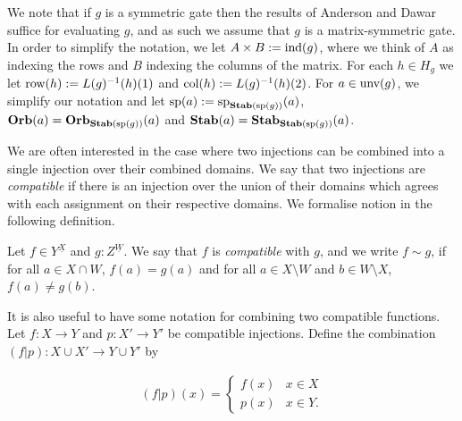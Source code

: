 \documentclass[../paper.tex]{subfiles}
\begin{document}
 

We note that if $g$ is a symmetric gate then the results of Anderson and
Dawar~\cite{AndersonD17} suffice for evaluating $g$, and as such we assume that
$g$ is a matrix-symmetric gate. In order to simplify the notation, we let $A
\times B := \text{\upshape ind}(g)$, where we think of $A$ as indexing the rows and $B$
indexing the columns of the matrix. For each $h \in H_g$ we let $\text{row}(h) :=
L(g)^{-1}(h)(1)$ and $\text{col}(h) := L(g)^{-1}(h)(2)$. For $a \in \text{unv}(g)$,
we simplify our notation and let $\text{sp}(a) := \text{sp}_{\text{\textbf{Stab}} (\text{sp} (g))}(a)$, $\text{\textbf{Orb}}(a)
= \text{\textbf{Orb}}_{\text{\textbf{Stab}} (\text{sp} (g))}(a)$ and $\text{\textbf{Stab}}(a) = \text{\textbf{Stab}}_{\text{\textbf{Stab}} (\text{sp} (g))}(a)$.

We are often interested in the case where two injections can be combined into a
single injection over their combined domains. We say that two injections are
\emph{compatible} if there is an injection over the union of their domains which
agrees with each assignment on their respective domains. We formalise notion in
the following definition.

\begin{definition}
	Let $f \in Y^{\underline{X}}$ and $g : Z^{\underline{W}}$. We say that $f$ is
  \emph{compatible} with $g$, and we write $f \sim g$, if for all $a \in X \cap
  W$, $f(a) = g(a)$ and for all $a \in X \setminus W$ and $b \in W \setminus X$,
  $f(a) \neq g(b)$.
\end{definition}

It is also useful to have some notation for combining two compatible functions.
Let $f : X \rightarrow Y$ and $p: X' \rightarrow Y'$ be compatible injections.
Define the combination $(f | p): X \cup X' \rightarrow Y \cup Y'$ by

\begin{align*}
	(f \vert p) (x) =
	\begin{cases}
    f (x) & x \in X  \\
    p (x) & x \in Y.
	\end{cases}
\end{align*}
\end{document}
